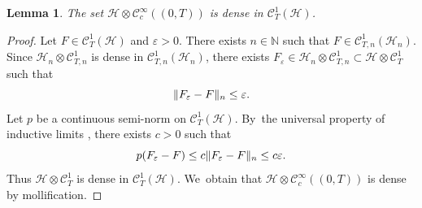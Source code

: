 \documentclass[10pt]{amsart}
\newtheorem{lemma}[theorem]{Lemma}
\theoremstyle{definition}
\theoremstyle{remark}
\DeclarePairedDelimiter{\norm}{\lVert}{\rVert}
\begin{document}
\begin{lemma}\label{t:density-tensor-product}
The set $\mathscr{H} \otimes \mathscr{C}_{c}^{\infty}((0,T))$ is dense in $\mathscr{C}^{1}_{T}(\mathscr{H})$.
\end{lemma}
\begin{proof}
Let $F \in \mathscr{C}^{1}_{T}(\mathscr{H})$ and $\varepsilon > 0$.
There exists $n \in \mathbb{N}$ such that $F \in \mathscr{C}^{1}_{T,n}(\mathscr{H}_{n})$.
Since $\mathscr{H}_{n} \otimes \mathscr{C}_{T,n}^{1}$ is dense in $\mathscr{C}_{T,n}^{1}(\mathscr{H}_{n})$, there exists $F_{\varepsilon} \in \mathscr{H}_{n} \otimes \mathscr{C}_{T,n}^{1} \subset \mathscr{H} \otimes \mathscr{C}_{T}^{1}$ such that
\begin{equation*}
\norm{F_{\varepsilon} - F}_{n} \leq \varepsilon.
\end{equation*}
Let $p$ be a continuous semi-norm on $\mathscr{C}^{1}_{T}(\mathscr{H})$.
By~the universal property of inductive limits \cite[Prop.\,5, p.\,II.29]{BourbakiEVT}, there exists $c > 0$ such that
\begin{equation*}
p(F_{\varepsilon} - F) \leq c \norm{F_{\varepsilon} - F}_{n} \leq c \varepsilon.
\end{equation*}
Thus $\mathscr{H} \otimes \mathscr{C}_{T}^{1}$ is dense in $\mathscr{C}_{T}^{1}(\mathscr{H})$. We~obtain that $\mathscr{H} \otimes \mathscr{C}_{c}^{\infty}((0,T))$ is dense by mollification.
\end{proof}
\end{document}
